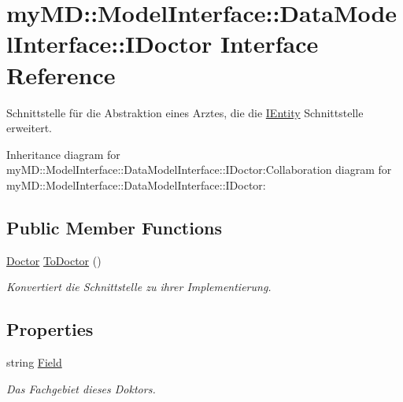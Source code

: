\hypertarget{interfacemy_m_d_1_1_model_interface_1_1_data_model_interface_1_1_i_doctor}{
\section{my\-MD::Model\-Interface::Data\-Model\-Interface::IDoctor Interface Reference}
\label{d0/d0d/interfacemy_m_d_1_1_model_interface_1_1_data_model_interface_1_1_i_doctor}
}
Schnittstelle f\"{u}r die Abstraktion eines Arztes, die die \hyperlink{interfacemy_m_d_1_1_model_interface_1_1_data_model_interface_1_1_i_entity}{IEntity} Schnittstelle erweitert.  


Inheritance diagram for my\-MD::Model\-Interface::Data\-Model\-Interface::IDoctor:Collaboration diagram for my\-MD::Model\-Interface::Data\-Model\-Interface::IDoctor:\subsection*{Public Member Functions}
\begin{CompactItemize}
\item 
\hyperlink{classmy_m_d_1_1_model_1_1_data_model_1_1_doctor}{Doctor} \hyperlink{interfacemy_m_d_1_1_model_interface_1_1_data_model_interface_1_1_i_doctor_603e176dcbd8ab965588d1e0cb671f64}{To\-Doctor} ()
\begin{CompactList}\small\item\em Konvertiert die Schnittstelle zu ihrer Implementierung. \item\end{CompactList}\end{CompactItemize}
\subsection*{Properties}
\begin{CompactItemize}
\item 
\hypertarget{interfacemy_m_d_1_1_model_interface_1_1_data_model_interface_1_1_i_doctor_6f16a5f8ff5d75ab84c018adacdfcbb7}{
string \hyperlink{interfacemy_m_d_1_1_model_interface_1_1_data_model_interface_1_1_i_doctor_6f16a5f8ff5d75ab84c018adacdfcbb7}{Field}}
\label{d0/d0d/interfacemy_m_d_1_1_model_interface_1_1_data_model_interface_1_1_i_doctor_6f16a5f8ff5d75ab84c018adacdfcbb7}

\begin{CompactList}\small\item\em Das Fachgebiet dieses Doktors. \item\end{CompactList}\end{CompactItemize}


